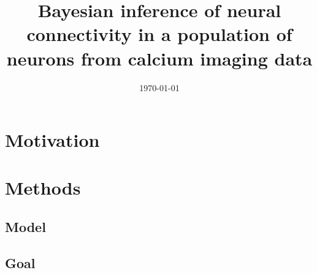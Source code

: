 \documentclass[amsmath, amssymb]{revtex4}
\begin{document}

\date{\today}

\title{Bayesian inference of neural connectivity in a population of neurons from 
calcium imaging data}


\begin{abstract}

\end{abstract}

\maketitle
\tableofcontents

\section{Motivation}
\label{sec1}


\section{Methods}
\label{sec:methods}



\subsection{Model} %
\label{sec:methods:markov-setup}


\subsection{Goal} %
\label{sec:methods:goal}

\end{document}
